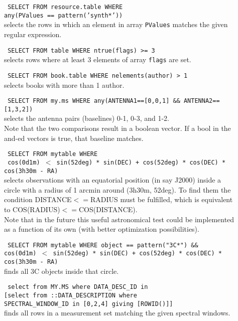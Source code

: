 \begin{description}
  \item[] \texttt{ SELECT FROM resource.table WHERE}
     \\\texttt{any(PValues == pattern('synth*'))}
     \\selects the rows in which an element in array
     \texttt{PValues} matches the given regular expression.

  \item[] \texttt{ SELECT FROM table WHERE ntrue(flags) >= 3}
     \\selects rows where at least 3 elements of array \texttt{flags}
     are set.

  \item[] \texttt{ SELECT FROM book.table WHERE nelements(author) > 1}
     \\selects books with more than 1 author.

  \item[] \texttt{ SELECT FROM my.ms WHERE
         any(ANTENNA1==[0,0,1] \&\& ANTENNA2==[1,3,2])}
     \\selects the antenna pairs (baselines) 0-1, 0-3, and 1-2.
     \\Note that the two comparisons result in a boolean vector. If
       a bool in the and-ed vectors is true, that baseline matches.

  \item[] \texttt{ SELECT FROM mytable WHERE}
     \\\texttt{ cos(0d1m) $<$
         sin(52deg) * sin(DEC) + cos(52deg) * cos(DEC) *
         cos(3h30m - RA) }
     \\selects observations with an equatorial position (in say J2000)
     inside a circle with a radius of 1 arcmin around (3h30m, 52deg).
     To find them the condition DISTANCE$<=$RADIUS must be fulfilled,
     which is equivalent to COS(RADIUS)$<=$COS(DISTANCE).
     \\Note that in the future this useful astronomical test could
     be implemented as a function of its own (with better optimization
     possibilities).

  \item[] \texttt{ SELECT FROM mytable WHERE object == pattern("3C*") \&\&}
     \\\texttt{cos(0d1m) $<$ sin(52deg) * sin(DEC) + cos(52deg) *
        cos(DEC) * cos(3h30m - RA) }
     \\finds all 3C objects inside that circle.

  \item[] \texttt{ select from MY.MS where DATA\_DESC\_ID in}
      \\\texttt{[select from ::DATA\_DESCRIPTION where}
      \\\texttt{SPECTRAL\_WINDOW\_ID in [0,2,4] giving [ROWID()]]}
      \\finds all rows in a measurement set matching the given
      spectral windows.


\end{description}
